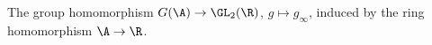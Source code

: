 The group homomorphism $G(\A)\to\GL_2(\R)$, $g\mapsto g_\infty$, induced by the ring homomorphism $\A\to\R$.
